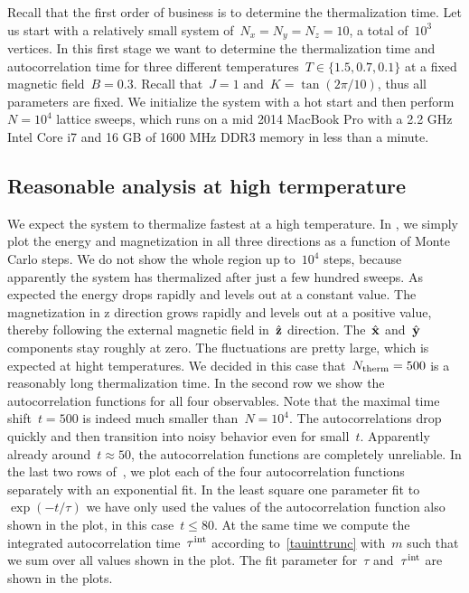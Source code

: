 Recall that the first order of business is to determine the thermalization time.
Let us start with a relatively small system of~$N_x = N_y = N_z = 10$, \ie{} a
total of~$10^3$ vertices. In this first stage we want to determine the
thermalization time and autocorrelation time for three different temperatures~$T
\in \{1.5, 0.7, 0.1\}$ at a fixed magnetic field~$B=0.3$. Recall that~$J=1$
and~$K=\tan(2 \pi / 10)$, thus all parameters are fixed. We initialize the
system with a hot start and then perform~$N=10^4$ lattice sweeps, which runs on
a mid 2014 MacBook Pro with a 2.2 GHz Intel Core i7 and 16 GB of 1600 MHz DDR3
memory in less than a minute.

\subsection{Reasonable analysis at high termperature}

We expect the system to thermalize fastest at a high temperature. In
, we simply plot the energy and magnetization in all three
directions as a function of Monte Carlo steps. We do not show the whole region
up to~$10^4$ steps, because apparently the system has thermalized after just a
few hundred sweeps. As expected the energy drops rapidly and levels out at a
constant value. The magnetization in z direction grows rapidly and levels out at
a positive value, thereby following the external magnetic field in~$\hat{\mathbf{z}}$
direction. The~$\hat{\mathbf{x}}$ and~$\hat{\mathbf{y}}$ components stay roughly at zero. The fluctuations
are pretty large, which is expected at hight temperatures. We decided in this
case that~$N_{\mathrm{therm}} = 500$ is a reasonably long thermalization time. In the
second row we show the autocorrelation functions for all four observables. Note
that the maximal time shift~$t = 500$ is indeed much smaller than~$N = 10^4$.
The autocorrelations drop quickly and then transition into noisy behavior even
for small~$t$. Apparently already around~$t \approx 50$, the autocorrelation
functions are completely unreliable.  In the last two rows of~,
we plot each of the four autocorrelation functions separately with an
exponential fit. In the least square one parameter fit to~$\exp(-t/\tau)$ we
have only used the values of the autocorrelation function also shown in the
plot, \ie{} in this case~$t \le 80$.  At the same time we compute the integrated
autocorrelation time~$\tau^{\mathrm{int}}$ according to~\eqref{tauinttrunc} with~$m$ such
that we sum over all values shown in the plot. The fit parameter for~$\tau$
and~$\tau^{\mathrm{int}}$ are shown in the plots.

